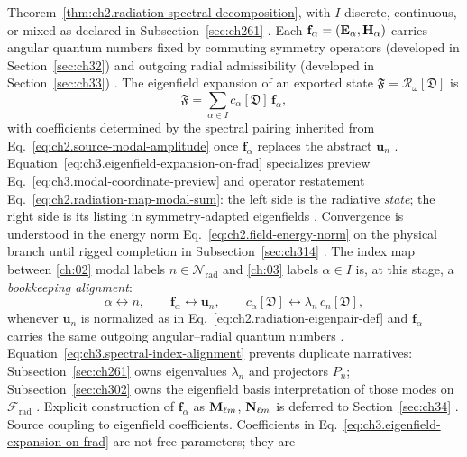Theorem~\ref{thm:ch2.radiation-spectral-decomposition}, with \(I\) discrete, continuous, or
mixed as declared in Subsection~\ref{sec:ch261} \cite{stratton1941}. Each
\(\mathbf{f}_\alpha=(\mathbf{E}_\alpha,\mathbf{H}_\alpha)\) carries angular quantum numbers fixed by commuting
symmetry operators (developed in Section~\ref{sec:ch32}) and outgoing radial admissibility
(developed in Section~\ref{sec:ch33}) \cite{jackson1999}. The eigenfield expansion
of an exported state \(\mathfrak{F}=\mathcal{R}_\omega[\mathfrak{D}]\) is
\begin{equation}
\label{eq:ch3.eigenfield-expansion-on-frad}
\mathfrak{F}
=
\sum_{\alpha\in I} c_\alpha[\mathfrak{D}]\,\mathbf{f}_\alpha,
\end{equation}
with coefficients determined by the spectral pairing inherited from
Eq.~\eqref{eq:ch2.source-modal-amplitude} once \(\mathbf{f}_\alpha\) replaces the abstract
\(\mathbf{u}_n\) \cite{stratton1941}. Equation~\eqref{eq:ch3.eigenfield-expansion-on-frad}
specializes preview Eq.~\eqref{eq:ch3.modal-coordinate-preview} and operator restatement
Eq.~\eqref{eq:ch2.radiation-map-modal-sum}: the left side is the radiative \emph{state}; the right
side is its listing in symmetry-adapted eigenfields \cite{hansen1988}. Convergence is
understood in the energy norm Eq.~\eqref{eq:ch2.field-energy-norm} on the physical branch until
rigged completion in Subsection~\ref{sec:ch314} \cite{stratton1941}.
The index map between \ref{ch:02} modal labels \(n\in\mathcal{N}_{\mathrm{rad}}\) and
\ref{ch:03} labels \(\alpha\in I\) is, at this stage, a \emph{bookkeeping alignment}:
\begin{equation}
\label{eq:ch3.spectral-index-alignment}
\alpha\longleftrightarrow n,
\qquad
\mathbf{f}_\alpha\longleftrightarrow \mathbf{u}_n,
\qquad
c_\alpha[\mathfrak{D}]\longleftrightarrow \lambda_n\,c_n[\mathfrak{D}],
\end{equation}
whenever \(\mathbf{u}_n\) is normalized as in Eq.~\eqref{eq:ch2.radiation-eigenpair-def} and
\(\mathbf{f}_\alpha\) carries the same outgoing angular--radial quantum numbers
\cite{stratton1941}. Equation~\eqref{eq:ch3.spectral-index-alignment} prevents duplicate narratives:
Subsection~\ref{sec:ch261} owns eigenvalues \(\lambda_n\) and projectors \(P_n\); Subsection~\ref{sec:ch302}
owns the eigenfield basis interpretation of those modes on \(\mathcal{F}_{\mathrm{rad}}\)
\cite{harrington2001}. Explicit construction of \(\mathbf{f}_\alpha\) as \(\mathbf{M}_{\ell m}\), \(\mathbf{N}_{\ell m}\) is
deferred to Section~\ref{sec:ch34} \cite{hansen1988}.
Source coupling to eigenfield coefficients. Coefficients in Eq.~\eqref{eq:ch3.eigenfield-expansion-on-frad} are not free parameters; they are
